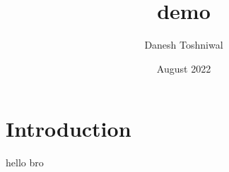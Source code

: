 \documentclass{article}
\title{demo}
\author{Danesh Toshniwal}
\date{August 2022}
\begin{document}
\maketitle

\section{Introduction}
hello bro 
\end{document}
